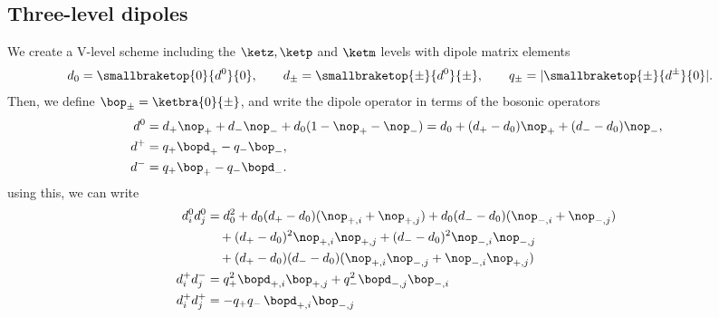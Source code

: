 \subsection{Three-level dipoles}
We create a \textsf{V}-level scheme including the $\ketz, \ketp$ and $\ketm$ levels with
dipole matrix elements
\begin{align}
    d_0 = \smallbraketop{0}{d^0}{0}, \qquad
    d_\pm = \smallbraketop{\pm}{d^0}{\pm}, \qquad
    q_\pm &= |\smallbraketop{\pm}{d^\pm}{0}|.
\end{align}
%
%
Then, we define $\bop_\pm=\ketbra{0}{{\pm}}$, and write the dipole operator in terms of the bosonic operators
\begin{align}
    d^0 &= d_+ \nop_+ + d_- \nop_- + d_0 (1-\nop_+-\nop_-) = d_0 + (d_+-d_0) \nop_+ + (d_--d_0) \nop_-, \\
    d^+ &= q_+ \bopd_+ - q_- \bop_-, \\
    d^- &= q_+ \bop_+  - q_- \bopd_-.
\end{align}
using this, we can write
\begin{align}
    d^0_i d^0_j &= d_0^2 + d_0(d_+-d_0) (\nop_{+,i}+\nop_{+,j}) + d_0(d_--d_0) (\nop_{-,i}+\nop_{-,j}) \\
                &\quad + (d_+ - d_0)^2 \nop_{+,i} \nop_{+,j} + (d_- - d_0)^2 \nop_{-,i} \nop_{-,j} \\
                &\quad + (d_+ - d_0)(d_- - d_0) (\nop_{+,i} \nop_{-,j} + \nop_{-,i} \nop_{+,j}) \\
    d^+_i d^-_j &= q_+^2 \bopd_{+,i} \bop_{+,j} + q_-^2 \bopd_{-,j} \bop_{-,i} \\
    d^+_i d^+_j &= - q_+q_- \, \bopd_{+,i} \bop_{-,j}
\end{align}
